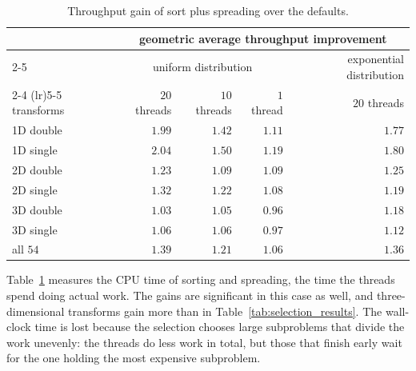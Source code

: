 \begin{table}[ht]
    \centering
    \small
    \begin{tabular}{lrrrr}
        \toprule
        & \multicolumn{4}{c}{geometric average throughput improvement} \\
        \cmidrule(lr){2-5}
        & \multicolumn{3}{c}{uniform distribution} & exponential distribution \\
        \cmidrule(lr){2-4} \cmidrule(lr){5-5}
        transforms & $20$ threads & $10$ threads & $1$ thread & $20$ threads \\
        \midrule
        1D double & $1.99$ & $1.42$ & $1.11$ & $1.77$ \\
        1D single & $2.04$ & $1.50$ & $1.19$ & $1.80$ \\
        2D double & $1.23$ & $1.09$ & $1.09$ & $1.25$ \\
        2D single & $1.32$ & $1.22$ & $1.08$ & $1.19$ \\
        3D double & $1.03$ & $1.05$ & $0.96$ & $1.18$ \\
        3D single & $1.06$ & $1.06$ & $0.97$ & $1.12$ \\
        \midrule
        all $54$ & $1.39$ & $1.21$ & $1.06$ & $1.36$ \\
        \bottomrule
    \end{tabular}
    \caption{Throughput gain of sort plus spreading over the defaults.}
    \label{tab:selection_work}
\end{table}

Table~\ref{tab:selection_work} measures the CPU time of sorting and spreading, the time the threads spend doing actual work. The gains are significant in this case as well, and three-dimensional transforms gain more than in Table~\ref{tab:selection_results}. The wall-clock time is lost because the selection chooses large subproblems that divide the work unevenly: the threads do less work in total, but those that finish early wait for the one holding the most expensive subproblem.

